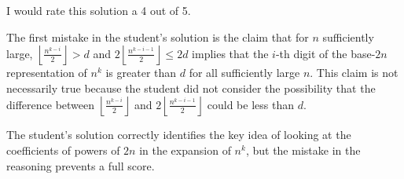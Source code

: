 I would rate this solution a 4 out of 5.

The first mistake in the student's solution is the claim that for $n$ sufficiently large, $\left\lfloor \frac{n^{k-i}}{2} \right\rfloor > d$ and $2\left\lfloor \frac{n^{k-i-1}}{2} \right\rfloor \leq 2d$ implies that the $i$-th digit of the base-$2n$ representation of $n^k$ is greater than $d$ for all sufficiently large $n$. This claim is not necessarily true because the student did not consider the possibility that the difference between $\left\lfloor \frac{n^{k-i}}{2} \right\rfloor$ and $2\left\lfloor \frac{n^{k-i-1}}{2} \right\rfloor$ could be less than $d$.

The student's solution correctly identifies the key idea of looking at the coefficients of powers of $2n$ in the expansion of $n^k$, but the mistake in the reasoning prevents a full score.
